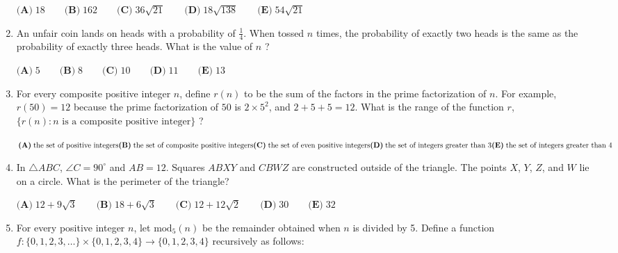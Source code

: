 \documentclass{article}
\begin{document}
\begin{enumerate}[label=\arabic*., itemsep=0.5em]
\(\textbf{(A)}\; 18 \qquad\textbf{(B)}\; 162 \qquad\textbf{(C)}\; 36\sqrt{21} \qquad\textbf{(D)}\; 18\sqrt{138} \qquad\textbf{(E)}\; 54\sqrt{21}\)\par \vspace{0.5em}\item An unfair coin lands on heads with a probability of \(\tfrac{1}{4}\). When tossed \(n\) times, the probability of exactly two heads is the same as the probability of exactly three heads. What is the value of \(n\) ?

\(\textbf{(A)}\; 5 \qquad\textbf{(B)}\; 8 \qquad\textbf{(C)}\; 10 \qquad\textbf{(D)}\; 11 \qquad\textbf{(E)}\; 13\)\par \vspace{0.5em}\item For every composite positive integer \(n\), define \(r(n)\) to be the sum of the factors in the prime factorization of \(n\). For example, \(r(50) = 12\) because the prime factorization of \(50\) is \(2 \times 5^{2}\), and \(2 + 5 + 5 = 12\). What is the range of the function \(r\), \(\{r(n): n \text{ is a composite positive integer}\}\) ?

\(\textbf{(A)}\; \text{the set of positive integers} \\
\textbf{(B)}\; \text{the set of composite positive integers} \\
\textbf{(C)}\; \text{the set of even positive integers} \\
\textbf{(D)}\; \text{the set of integers greater than 3} \\
\textbf{(E)}\; \text{the set of integers greater than 4}\)\par \vspace{0.5em}\item In \(\triangle ABC\), \(\angle C = 90^\circ\) and \(AB = 12\). Squares \(ABXY\) and \(CBWZ\) are constructed outside of the triangle. The points \(X\), \(Y\), \(Z\), and \(W\) lie on a circle. What is the perimeter of the triangle?

\(\textbf{(A)}\; 12+9\sqrt{3} \qquad\textbf{(B)}\; 18+6\sqrt{3} \qquad\textbf{(C)}\; 12+12\sqrt{2} \qquad\textbf{(D)}\; 30 \qquad\textbf{(E)}\; 32\)\par \vspace{0.5em}\item For every positive integer \(n\), let \(\text{mod}_5 (n)\) be the remainder obtained when \(n\) is divided by 5. Define a function \(f: \{0,1,2,3,\dots\} \times \{0,1,2,3,4\} \to \{0,1,2,3,4\}\) recursively as follows:



\end{enumerate}
\end{document}
